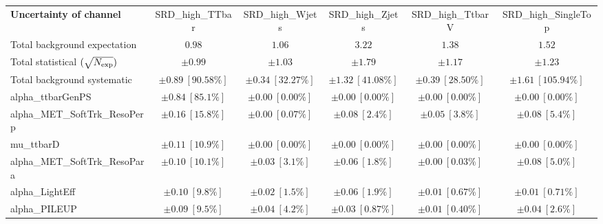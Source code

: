
\begin{sidewaystable}
\begin{center}
\setlength{\tabcolsep}{0.0pc}
\begin{tabular*}{\textwidth}{@{\extracolsep{\fill}}lccccc}
\noalign{\smallskip}\hline\noalign{\smallskip}
{\bf Uncertainty of channel}                                    & SRD\_high\_TTbar            & SRD\_high\_Wjets            & SRD\_high\_Zjets            & SRD\_high\_TtbarV            & SRD\_high\_SingleTop            \\
\noalign{\smallskip}\hline\noalign{\smallskip}
Total background expectation             &  $0.98$        &  $1.06$        &  $3.22$        &  $1.38$        &  $1.52$       \\
\noalign{\smallskip}\hline\noalign{\smallskip}
Total statistical $(\sqrt{N_{\rm exp}})$              & $\pm 0.99$        & $\pm 1.03$        & $\pm 1.79$        & $\pm 1.17$        & $\pm 1.23$       \\
Total background systematic               & $\pm 0.89\ [90.58\%] $        & $\pm 0.34\ [32.27\%] $        & $\pm 1.32\ [41.08\%] $        & $\pm 0.39\ [28.50\%] $        & $\pm 1.61\ [105.94\%] $             \\
\noalign{\smallskip}\hline\noalign{\smallskip}
\noalign{\smallskip}\hline\noalign{\smallskip}
alpha\_ttbarGenPS         & $\pm 0.84\ [85.1\%] $          & $\pm 0.00\ [0.00\%] $          & $\pm 0.00\ [0.00\%] $          & $\pm 0.00\ [0.00\%] $          & $\pm 0.00\ [0.00\%] $       \\
alpha\_MET\_SoftTrk\_ResoPerp         & $\pm 0.16\ [15.8\%] $          & $\pm 0.00\ [0.07\%] $          & $\pm 0.08\ [2.4\%] $          & $\pm 0.05\ [3.8\%] $          & $\pm 0.08\ [5.4\%] $       \\
mu\_ttbarD         & $\pm 0.11\ [10.9\%] $          & $\pm 0.00\ [0.00\%] $          & $\pm 0.00\ [0.00\%] $          & $\pm 0.00\ [0.00\%] $          & $\pm 0.00\ [0.00\%] $       \\
alpha\_MET\_SoftTrk\_ResoPara         & $\pm 0.10\ [10.1\%] $          & $\pm 0.03\ [3.1\%] $          & $\pm 0.06\ [1.8\%] $          & $\pm 0.00\ [0.03\%] $          & $\pm 0.08\ [5.0\%] $       \\
alpha\_LightEff         & $\pm 0.10\ [9.8\%] $          & $\pm 0.02\ [1.5\%] $          & $\pm 0.06\ [1.9\%] $          & $\pm 0.01\ [0.67\%] $          & $\pm 0.01\ [0.71\%] $       \\
alpha\_PILEUP         & $\pm 0.09\ [9.5\%] $          & $\pm 0.04\ [4.2\%] $          & $\pm 0.03\ [0.87\%] $          & $\pm 0.01\ [0.40\%] $          & $\pm 0.04\ [2.6\%] $       \\

\end{tabular*}
\end{center}
\end{sidewaystable}
